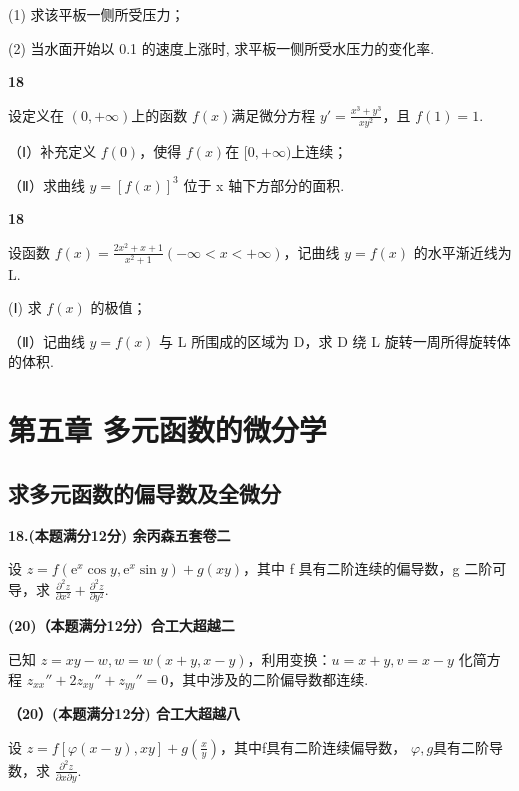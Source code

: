 \documentclass[a4paper,12pt]{article}
\begin{document}
(1) 求该平板一侧所受压力；

(2) 当水面开始以 0.1 的速度上涨时, 求平板一侧所受水压力的变化率.

\vspace{0.5cm}

\textbf{18}

设定义在 $(0, +\infty)$上的函数 $f(x)$满足微分方程 $y' = \frac{x^{3} + y^{3}}{xy^{2}}$，且 $f(1) = 1$.

（Ⅰ）补充定义 $f(0)$，使得 $f(x)$在 $[0,+\infty)$上连续；

（Ⅱ）求曲线 $y = [f(x)]^{3}$ 位于 x 轴下方部分的面积.

\vspace{0.5cm}

\textbf{18}

设函数 $f(x) = \frac{2x^{2} + x + 1}{x^{2} + 1} (-\infty < x < +\infty)$，记曲线 $y = f(x)$ 的水平渐近线为 L.

(Ⅰ) 求 $f(x)$ 的极值；

（Ⅱ）记曲线 $y = f(x)$ 与 L 所围成的区域为 D，求 D 绕 L 旋转一周所得旋转体的体积.

\section{第五章 多元函数的微分学}

\subsection{求多元函数的偏导数及全微分}

\textbf{18.(本题满分12分) 余丙森五套卷二}

设 $z=f\left(\mathrm{e}^{x}\cos y,\mathrm{e}^{x}\sin y\right)+g\left(xy\right)$，其中 f 具有二阶连续的偏导数，g 二阶可导，求 $\frac{\partial^{2}z}{\partial x^{2}}+\frac{\partial^{2}z}{\partial y^{2}}$.

\vspace{0.5cm}

\textbf{(20)（本题满分12分）合工大超越二}

已知 $z = xy - w, w = w(x + y, x - y)$，利用变换：$u = x + y, v = x - y$ 化简方程 $z_{xx}'' + 2z_{xy}'' + z_{yy}'' = 0$，其中涉及的二阶偏导数都连续.

\vspace{0.5cm}

\textbf{（20）(本题满分12分) 合工大超越八}

设 $z=f[\varphi(x-y),xy]+g\left(\frac{x}{y}\right)$，其中f具有二阶连续偏导数， $\varphi,g$具有二阶导数，求 $\frac{\partial^{2}z}{\partial x\partial y}$.
\end{document}
